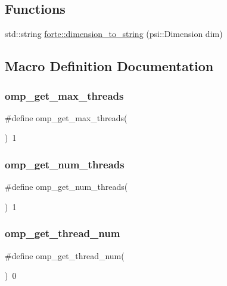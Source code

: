 \subsection*{Functions}
\begin{DoxyCompactItemize}
\item 
std\+::string \mbox{\hyperlink{namespaceforte_a65b11bc0db5d6e54f6853083b8b5ba75}{forte\+::dimension\+\_\+to\+\_\+string}} (psi\+::\+Dimension dim)
\end{DoxyCompactItemize}


\subsection{Macro Definition Documentation}
\mbox{\label{ci-no_8cc_a59e73060d1552ccda56039c7f3d25a84}} 
\subsubsection{\texorpdfstring{omp\+\_\+get\+\_\+max\+\_\+threads}{omp\_get\_max\_threads}}
{\footnotesize\ttfamily \#define omp\+\_\+get\+\_\+max\+\_\+threads(\begin{DoxyParamCaption}{ }\end{DoxyParamCaption})~1}

\mbox{\label{ci-no_8cc_a4353281743925f182316dba7cda58fee}} 
\subsubsection{\texorpdfstring{omp\+\_\+get\+\_\+num\+\_\+threads}{omp\_get\_num\_threads}}
{\footnotesize\ttfamily \#define omp\+\_\+get\+\_\+num\+\_\+threads(\begin{DoxyParamCaption}{ }\end{DoxyParamCaption})~1}

\mbox{\label{ci-no_8cc_a889ec205c635b219999c761b28cc39ba}} 
\subsubsection{\texorpdfstring{omp\+\_\+get\+\_\+thread\+\_\+num}{omp\_get\_thread\_num}}
{\footnotesize\ttfamily \#define omp\+\_\+get\+\_\+thread\+\_\+num(\begin{DoxyParamCaption}{ }\end{DoxyParamCaption})~0}

